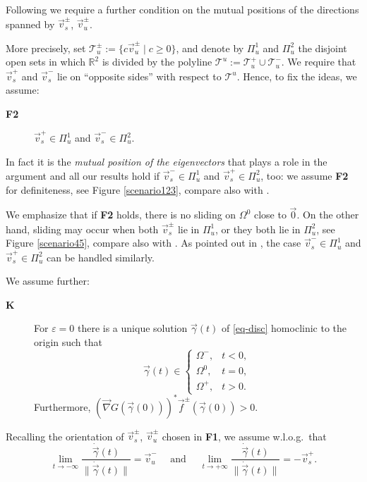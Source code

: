 \documentclass[10pt]{article}
\numberwithin{equation}{section}
\def\ga{\vec{\gamma}}
\def\ep{\varepsilon}
\def\Om{\Omega}
\def\na{\vec{\nabla}}
\def\R{{\mathbb R}}
\def\f{\vec{f}}
\newcommand{\lit}{{\lim_{t \to +\infty}}}
\newcommand{\lito}{{\lim_{t \to -\infty}}}
\newcommand\assump[1]{{\rm\textbf{#1}}}
\theoremstyle{definition}
\theoremstyle{remark}
\begin{document}
Following \cite{CFPRimut, CFPrestate} we require a further condition on the mutual positions
 of the
directions spanned by
$\vec{v}_s^{\pm}$, $\vec{v}_u^{\pm}$.

More precisely, set $\mathcal{T}_u^{\pm}:=\{ c\vec{v}_u^{\pm} \mid c \ge 0 \}$, and
denote by $\Pi_u^1$ and $\Pi_u^2$ the disjoint open sets
in which $\R^2$ is divided by the polyline $\mathcal{T}^u:=\mathcal{T}_u^+ \cup \mathcal{T}_u^-$.
We require that $\vec{v}_s^+$ and $\vec{v}_s^-$ lie on ``opposite sides'' with respect to
	$\mathcal{T}^u$.
Hence, to fix the ideas, we assume: \begin{description}
	\item[\assump{F2}]   $\vec{v}_s^+ \in \Pi_u^1$ and $\vec{v}_s^- \in \Pi_u^2$.
\end{description}
In fact  it is the \emph{mutual position of the eigenvectors} that plays a role in the argument and all our results hold
if  $\vec{v}_s^- \in \Pi_u^1$ and $\vec{v}_s^+ \in \Pi_u^2$, too: we assume \assump{F2} for definiteness, see Figure \ref{scenario123}, compare also with \cite[Remark 2.1]{CFPRimut}.

We emphasize that if \assump{F2} holds, there is no sliding on $\Om^0$ close to $\vec{0}$.
On the other hand, sliding may occur when both  $\vec{v}_s^{\pm}$ lie in
$\Pi_u^1$, or they both lie in  $ \Pi_u^2$, see Figure \ref{scenario45}, compare also with \cite[\S 3]{FrPo}.
As pointed out in  \cite{CFPRimut, CFPrestate}, the case $\vec{v}_s^- \in \Pi_u^1$ and $\vec{v}_s^+ \in \Pi_u^2$
can be handled similarly.


We assume further:
\begin{description}
	\item[\assump{K}] For $\ep=0$ there is  a unique solution $\ga(t)$ of \eqref{eq-disc} homoclinic to the origin such that
	$$\ga(t)\in\begin{cases}\Om^-,& t<0,\\\Om^0,&t=0,\\\Om^+,&t>0.\end{cases}$$
	Furthermore, $(\na G(\ga(0)))^*\f^\pm(\ga(0))>0$.
\end{description}
Recalling  the orientation of $\vec{v}_s^{\pm}$, $\vec{v}_u^{\pm}$ chosen in \assump{F1}, we assume w.l.o.g.\  that
\begin{equation}\label{ass.scenario}
\lito\frac{\dot{\ga}(t)}{\|\dot{\ga}(t)\|}=\vec{v}_u^-
\quad \mbox{ and } \quad
\lit\frac{\dot{\ga}(t)}{\|\dot{\ga}(t)\|}=-\vec{v}_s^+.
\end{equation}
\end{document}
